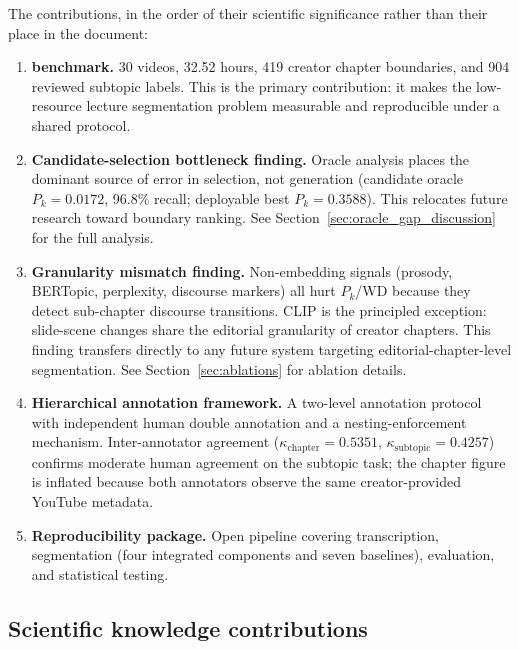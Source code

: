 The contributions, in the order of their scientific significance rather than
their place in the document:

\begin{enumerate}
  \item \textbf{\dataset{} benchmark.}
    30 videos, 32.52 hours, 419 creator chapter boundaries, and 904 reviewed
    subtopic labels.
    This is the primary contribution: it makes the low-resource lecture
    segmentation problem measurable and reproducible under a shared protocol.

  \item \textbf{Candidate-selection bottleneck finding.}
    Oracle analysis places the dominant source of error in selection, not
    generation (candidate oracle $P_k=0.0172$, 96.8\% recall; deployable best
    $P_k=0.3588$). This relocates future research toward boundary ranking.
    See Section~\ref{sec:oracle_gap_discussion} for the full analysis.

  \item \textbf{Granularity mismatch finding.}
    Non-embedding signals (prosody, BERTopic, perplexity, discourse markers)
    all hurt $P_k$/WD because they detect sub-chapter discourse transitions.
    CLIP is the principled exception: slide-scene changes share the editorial
    granularity of creator chapters. This finding transfers directly to any
    future system targeting editorial-chapter-level segmentation.
    See Section~\ref{sec:ablations} for ablation details.

  \item \textbf{Hierarchical annotation framework.}
    A two-level annotation protocol with independent human double annotation
    and a nesting-enforcement mechanism.
    Inter-annotator agreement ($\kappa_{\text{chapter}}=0.5351$,
    $\kappa_{\text{subtopic}}=0.4257$) confirms moderate human agreement
    on the subtopic task; the chapter figure is inflated because both
    annotators observe the same creator-provided YouTube metadata.

  \item \textbf{Reproducibility package.}
    Open pipeline covering transcription, segmentation (four integrated
    components and seven baselines), evaluation, and statistical testing.
\end{enumerate}

\subsection*{Scientific knowledge contributions}

